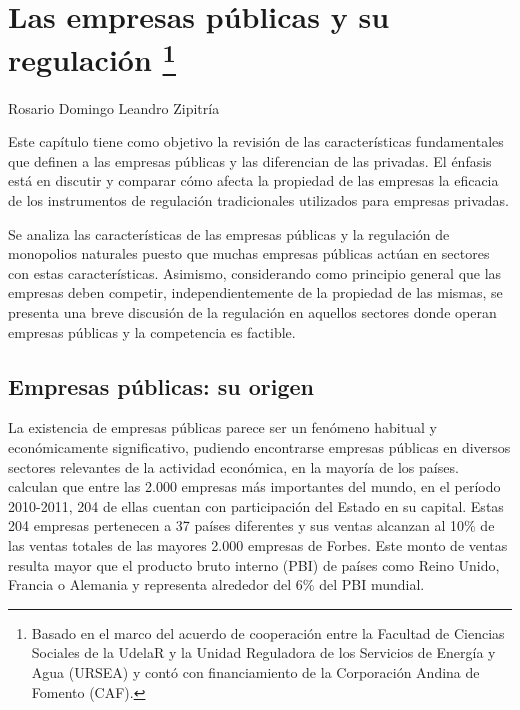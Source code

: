 \documentclass[
  12pt,
  spanish,
]{book}
\begin{document}
\hypertarget{reg-eepp}{%
\chapter[Las empresas públicas y su regulación ]{\texorpdfstring{Las
empresas públicas y su regulación \footnote{Basado en el marco del
  acuerdo de cooperación entre la Facultad de Ciencias Sociales de la
  UdelaR y la Unidad Reguladora de los Servicios de Energía y Agua
  (URSEA) y contó con financiamiento de la Corporación Andina de Fomento
  (CAF).}}{Las empresas públicas y su regulación }}\label{reg-eepp}}

Rosario Domingo Leandro Zipitría

Este capítulo tiene como objetivo la revisión de las características
fundamentales que definen a las empresas públicas y las diferencian de
las privadas. El énfasis está en discutir y comparar cómo afecta la
propiedad de las empresas la eficacia de los instrumentos de regulación
tradicionales utilizados para empresas privadas.

Se analiza las características de las empresas públicas y la regulación
de monopolios naturales puesto que muchas empresas públicas actúan en
sectores con estas características. Asimismo, considerando como
principio general que las empresas deben competir, independientemente de
la propiedad de las mismas, se presenta una breve discusión de la
regulación en aquellos sectores donde operan empresas públicas y la
competencia es factible.

\hypertarget{empresas-puxfablicas-su-origen}{%
\section{Empresas públicas: su
origen}\label{empresas-puxfablicas-su-origen}}

La existencia de empresas públicas parece ser un fenómeno habitual y
económicamente significativo, pudiendo encontrarse empresas públicas en
diversos sectores relevantes de la actividad económica, en la mayoría de
los países. \citet{Kowalski2013} calculan que entre las 2.000 empresas
más importantes del mundo, en el período 2010-2011, 204 de ellas cuentan
con participación del Estado en su capital. Estas 204 empresas
pertenecen a 37 países diferentes y sus ventas alcanzan al 10\% de las
ventas totales de las mayores 2.000 empresas de Forbes. Este monto de
ventas resulta mayor que el producto bruto interno (PBI) de países como
Reino Unido, Francia o Alemania y representa alrededor del 6\% del PBI
mundial.
\end{document}
